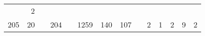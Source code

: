\documentclass[]{article}
\begin{document}
{\begin{longtable}[]{@{}rrrrrrrrrrrrrr@{}}
\begin{minipage}[t]{0.04\columnwidth}
\strut
\end{minipage} & \begin{minipage}[t]{0.04\columnwidth}\raggedleft\strut
2\strut
\end{minipage} & \begin{minipage}[t]{0.04\columnwidth}\raggedleft\strut
\strut
\end{minipage}\tabularnewline
\begin{minipage}[t]{0.05\columnwidth}\raggedleft\strut
205\strut
\end{minipage} & \begin{minipage}[t]{0.05\columnwidth}\raggedleft\strut
20\strut
\end{minipage} & \begin{minipage}[t]{0.05\columnwidth}\raggedleft\strut
\strut
\end{minipage} & \begin{minipage}[t]{0.04\columnwidth}\raggedleft\strut
204\strut
\end{minipage} & \begin{minipage}[t]{0.05\columnwidth}\raggedleft\strut
\strut
\end{minipage} & \begin{minipage}[t]{0.05\columnwidth}\raggedleft\strut
1259\strut
\end{minipage} & \begin{minipage}[t]{0.05\columnwidth}\raggedleft\strut
140\strut
\end{minipage} & \begin{minipage}[t]{0.04\columnwidth}\raggedleft\strut
107\strut
\end{minipage} & \begin{minipage}[t]{0.05\columnwidth}\raggedleft\strut
\strut
\end{minipage} & \begin{minipage}[t]{0.04\columnwidth}\raggedleft\strut
2\strut
\end{minipage} & \begin{minipage}[t]{0.04\columnwidth}\raggedleft\strut
1\strut
\end{minipage} & \begin{minipage}[t]{0.04\columnwidth}\raggedleft\strut
2\strut
\end{minipage} & \begin{minipage}[t]{0.04\columnwidth}\raggedleft\strut
9\strut
\end{minipage} & \begin{minipage}[t]{0.04\columnwidth}\raggedleft\strut
2\strut
\end{minipage}\tabularnewline

\end{longtable}}
\end{document}
